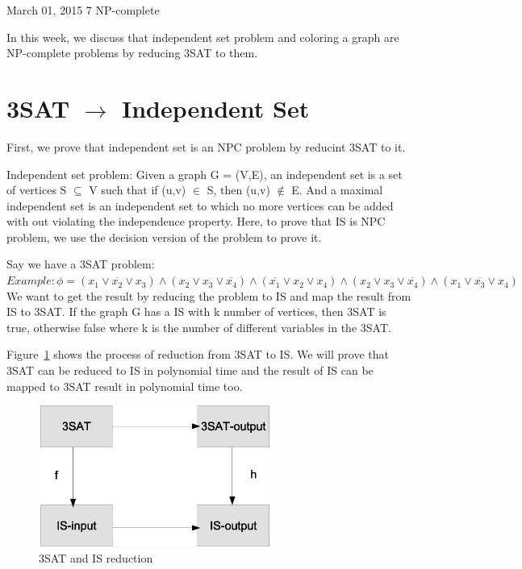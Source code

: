 \documentclass[usletter]{article}
\begin{document}
           {March 01, 2015}                          %
           {7}                                       %
           {NP-complete}  %

\noindent
In this week, we discuss that independent set problem and coloring a graph are NP-complete problems by reducing 3SAT to them. 

\section{3SAT $\rightarrow$ Independent Set}
First, we prove that independent set is an NPC problem by reducint 3SAT to it.

Independent set problem: Given a graph G = (V,E), an independent set is a set of vertices S $\subseteq$  V such that if (u,v) $\in$ S, then (u,v) $\notin$ E.  And a maximal independent set is an independent set to which no more vertices can be added with out violating the independence property. Here, to prove that IS is NPC problem, we use the decision version of the problem to prove it.

Say we have a 3SAT problem:
$Example: \phi = (x_{1} \vee \overline{x_{2}} \vee x_{3}) \wedge (x_{2} \vee x_{3} \vee \overline{x_{4}}) \wedge (\overline{x_{1}} \vee x_{2} \vee x_{4}) \wedge (x_{2} \vee x_{3} \vee \overline{x_{4}}) \wedge (x_{1} \vee \overline{x_{3}} \vee x_{4})$
We want to get the result by reducing the problem to IS and map the result from IS to 3SAT. If the graph G has a IS with k number of vertices, then 3SAT is true, otherwise false where k is the number of different variables in the 3SAT.

Figure~\ref{fig:reduction-IS} shows the process of reduction from 3SAT to IS. We will prove that 3SAT can be reduced to IS in polynomial time and the result of IS can be mapped to 3SAT result in polynomial time too.

\begin{figure}[bht]
\begin{center}
     \includegraphics[width=3.0in]{figures/reduction-IS}
\caption{\label{fig:reduction-IS}3SAT and IS reduction}
\end{center}
\end{figure}
\end{document}

